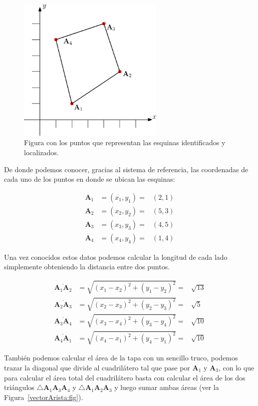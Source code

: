 \begin{figure}
 \centering
 \includegraphics[width=7cm]{Img/01/cuadrilatero_diagrama}
 \caption[Cuadrilátero localizado en el espacio]{ 
 Figura con los puntos que representan las esquinas identificados y localizados.
 } \label{cuadrilateroDiagrama:fig}
\end{figure}

De donde podemos conocer, gracias al sistema de referencia, las coordenadas de cada uno de los puntos en donde se ubican las esquinas:

\begin{eqnarray}
\textbf{A}_1 & =  (x_1, y_1)  = & (2,1) \nonumber \\
\textbf{A}_2 & =  (x_2, y_2)  = & (5,3) \nonumber \\
\textbf{A}_3 & =  (x_3, y_3)  = & (4,5) \nonumber \\
\textbf{A}_4 & =  (x_4, y_4)  = & (1,4) \nonumber
\end{eqnarray}

Una vez conocidos estos datos podemos calcular la longitud de cada lado simplemente obteniendo la distancia entre dos puntos.

\begin{eqnarray}
\overline{\textbf{A}_1 \textbf{A}_2} & =  \sqrt{(x_1 - x_2)^2 + (y_1 - y_2)^2}  = & \sqrt{13}  \nonumber \\
\overline{\textbf{A}_2 \textbf{A}_3} & =  \sqrt{(x_2 - x_3)^2 + (y_2 - y_3)^2}  = & \sqrt{5}   \nonumber \\
\overline{\textbf{A}_3 \textbf{A}_4} & =  \sqrt{(x_3 - x_4)^2 + (y_3 - y_4)^2}  = & \sqrt{10}  \nonumber \\
\overline{\textbf{A}_4 \textbf{A}_1} & =  \sqrt{(x_4 - x_1)^2 + (y_4 - y_1)^2}  = & \sqrt{10}  \nonumber
\end{eqnarray}

También podemos calcular el área de la tapa con un sencillo truco, podemos trazar la diagonal que divide al cuadrilátero tal que pase por $\textbf{A}_1$ y $\textbf{A}_3$, con lo que para calcular el área total del cuadrilátero basta con calcular el área de los dos triángulos $\bigtriangleup \textbf{A}_1 \textbf{A}_3 \textbf{A}_4$ y $\bigtriangleup \textbf{A}_1 \textbf{A}_2 \textbf{A}_3$ y luego sumar ambas áreas (ver la Figura~\ref{vectorArista:fig}).


